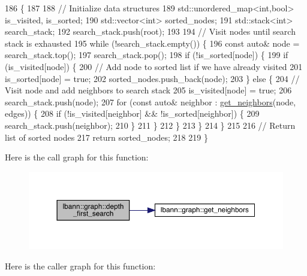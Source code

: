 \begin{DoxyCode}
186                                                                           \{
187 
188   \textcolor{comment}{// Initialize data structures}
189   std::unordered\_map<int,bool> is\_visited, is\_sorted;
190   std::vector<int> sorted\_nodes;
191   std::stack<int> search\_stack;
192   search\_stack.push(root);
193 
194   \textcolor{comment}{// Visit nodes until search stack is exhausted}
195   \textcolor{keywordflow}{while} (!search\_stack.empty()) \{
196     \textcolor{keyword}{const} \textcolor{keyword}{auto}& node = search\_stack.top();
197     search\_stack.pop();
198     \textcolor{keywordflow}{if} (!is\_sorted[node]) \{
199       \textcolor{keywordflow}{if} (is\_visited[node]) \{
200         \textcolor{comment}{// Add node to sorted list if we have already visited}
201         is\_sorted[node] = \textcolor{keyword}{true};
202         sorted\_nodes.push\_back(node);
203       \} \textcolor{keywordflow}{else} \{
204         \textcolor{comment}{// Visit node and add neighbors to search stack}
205         is\_visited[node] = \textcolor{keyword}{true};
206         search\_stack.push(node);
207         \textcolor{keywordflow}{for} (\textcolor{keyword}{const} \textcolor{keyword}{auto}& neighbor : \hyperlink{namespacelbann_1_1graph_ad305e0d104d25d9cb1e63a4b93c0847c}{get\_neighbors}(node, edges)) \{
208           \textcolor{keywordflow}{if} (!is\_visited[neighbor] && !is\_sorted[neighbor]) \{
209             search\_stack.push(neighbor);
210           \}
211         \}
212       \}
213     \}
214   \}
215 
216   \textcolor{comment}{// Return list of sorted nodes}
217   \textcolor{keywordflow}{return} sorted\_nodes;
218 
219 \}
\end{DoxyCode}
Here is the call graph for this function\+:\nopagebreak
\begin{figure}[H]
\begin{center}
\leavevmode
\includegraphics[width=350pt]{namespacelbann_1_1graph_a44394207f3566604f867382b10aaf974_cgraph}
\end{center}
\end{figure}
Here is the caller graph for this function\+:\nopagebreak
